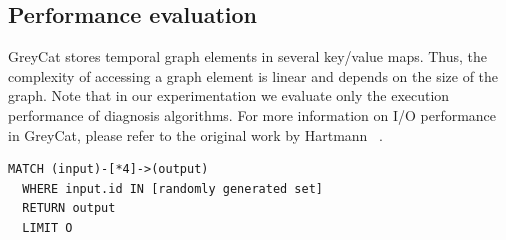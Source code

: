 %
%
% 
%

\subsection{Performance evaluation}
GreyCat stores temporal graph elements in several key/value maps. Thus, the complexity of accessing a graph element is linear and depends on the size of the graph. 
Note that in our experimentation we evaluate only the execution performance of diagnosis algorithms. For more information on I/O performance in GreyCat, please refer to the original work by Hartmann \etal~\cite{DBLP:conf/seke/0001FJRT17, DBLP:phd/basesearch/Hartmann16}.

\begin{lstlisting}[style=customc,caption=Traversal used during the experimentations,label=code:traversal-used,basicstyle=\scriptsize]
  MATCH (input)-[*4]->(output)
  WHERE input.id IN [randomly generated set]
  RETURN output
  LIMIT O
\end{lstlisting}

